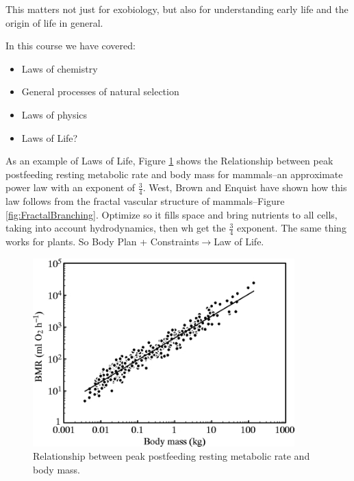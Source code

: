 \documentclass[]{article}
\begin{document}
This matters not just for exobiology, but also for understanding early life and the origin of life in general.

In this course we have covered:
\begin{itemize}
	\item Laws of chemistry
	\item General processes of natural selection
	\item Laws of physics
	\item Laws of Life?
\end{itemize}

As an example of Laws of Life, Figure \ref{fig:allometric:scaling} shows the Relationship between peak postfeeding resting metabolic rate and body mass for mammals\cite{white2005allometric}--an approximate power law with an exponent of $\frac{3}{4}$. West, Brown and Enquist\cite{west1997general} have shown how this law follows from the fractal vascular structure of mammals--Figure \ref{fig:FractalBranching}. Optimize so it fills space and bring nutrients to all cells, taking into account hydrodynamics, then wh get the $\frac{3}{4}$ exponent. The same thing works for plants. So Body Plan + Constraints$\rightarrow$Law of Life.

\begin{figure}[H]
	\caption{Relationship between peak postfeeding resting metabolic rate and body mass.}\label{fig:allometric:scaling}
	\includegraphics[width=0.9\textwidth]{WhiteSeymour}
\end{figure}
\end{document}
